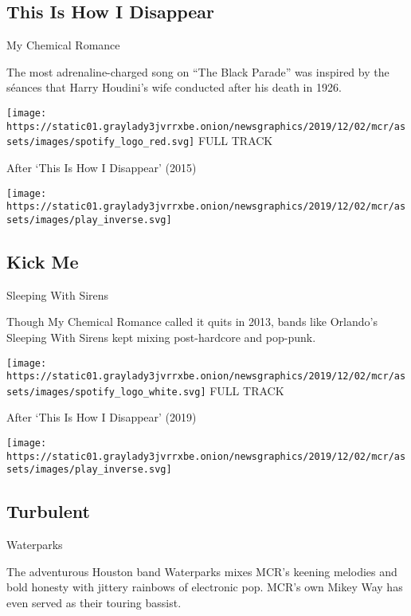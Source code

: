 \hypertarget{this-is-how-i-disappear-1}{%
\subsection{This Is How I Disappear}\label{this-is-how-i-disappear-1}}

My Chemical Romance

The most adrenaline-charged song on ``The Black Parade'' was inspired by
the séances that Harry Houdini's wife conducted after his death in 1926.

\href{https://open.spotify.com/track/0rUNZQuYQvOz6A6zwyT6tM?si=Fjo42CCDRpqgVOY0tcHIAA}{}

\texttt{[image: https://static01.graylady3jvrrxbe.onion/newsgraphics/2019/12/02/mcr/assets/images/spotify\_logo\_red.svg]}
FULL TRACK

After `This Is How I Disappear' (2015)

\texttt{[image: https://static01.graylady3jvrrxbe.onion/newsgraphics/2019/12/02/mcr/assets/images/play\_inverse.svg]}

\hypertarget{kick-me}{%
\subsection{Kick Me}\label{kick-me}}

Sleeping With Sirens

Though My Chemical Romance called it quits in 2013, bands like Orlando's
Sleeping With Sirens kept mixing post-hardcore and pop-punk.

\href{https://open.spotify.com/track/5LfFjqx9c83BMXrJVfYT0Y?si=xijXFcSqS0GLFBqsimuRiQ}{}

\texttt{[image: https://static01.graylady3jvrrxbe.onion/newsgraphics/2019/12/02/mcr/assets/images/spotify\_logo\_white.svg]}
FULL TRACK

After `This Is How I Disappear' (2019)

\texttt{[image: https://static01.graylady3jvrrxbe.onion/newsgraphics/2019/12/02/mcr/assets/images/play\_inverse.svg]}

\hypertarget{turbulent}{%
\subsection{Turbulent}\label{turbulent}}

Waterparks

The adventurous Houston band Waterparks mixes MCR's keening melodies and
bold honesty with jittery rainbows of electronic pop. MCR's own Mikey
Way has even served as their touring bassist.

